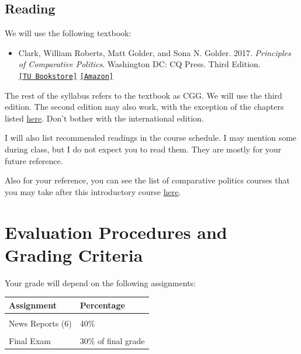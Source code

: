 \documentclass[
  11pt,
]{article}
\providecommand{\tightlist}{%
  \setlength{\itemsep}{0pt}\setlength{\parskip}{0pt}}
\begin{document}
\hypertarget{reading}{%
\subsection{Reading}\label{reading}}

We will use the following textbook:

\begin{itemize}
\tightlist
\item
  Clark, William Roberts, Matt Golder, and Sona N. Golder. 2017.
  \emph{Principles of Comparative Politics}. Washington DC: CQ Press.
  Third Edition.
  \href{https://tulane.bncollege.com/shop/BNCB_TextbookDetailView?displayStoreId=13559\&urlRequestType=Base\&catalogId=10001\&productId=600007976346\&langId=-1\&partNumber=MBS_1944592\&storeId=13559\&sectionId=102216419\&item=N}{\texttt{{[}TU\ Bookstore{]}}}
  \href{https://www.amazon.com/Principles-Comparative-Politics-William-Roberts/dp/1506318126}{\texttt{{[}Amazon{]}}}
\end{itemize}

The rest of the syllabus refers to the textbook as CGG. We will use the
third edition. The second edition may also work, with the exception of
the chapters listed \href{http://mattgolder.com/books/pocp}{here}. Don't
bother with the international edition.

I will also list recommended readings in the course schedule. I may
mention some during class, but I do not expect you to read them. They
are mostly for your future reference.

Also for your reference, you can see the list of comparative politics
courses that you may take after this introductory course
\href{https://catalog.tulane.edu/courses/polc/}{here}.

\hypertarget{evaluation-procedures-and-grading-criteria}{%
\section{Evaluation Procedures and Grading
Criteria}\label{evaluation-procedures-and-grading-criteria}}

Your grade will depend on the following assignments:

\begin{table}[!h]
\centering
\begin{tabular}[t]{ll}
\toprule
Assignment & Percentage\\
\midrule
\cellcolor{gray!6}{Quizzes (6)} & \cellcolor{gray!6}{40\%}\\
News Reports (6) & 40\%\\
\cellcolor{gray!6}{Participation} & \cellcolor{gray!6}{20\%}\\
Final Exam & 30\% of final grade\\
\bottomrule
\end{tabular}
\end{table}
\end{document}
